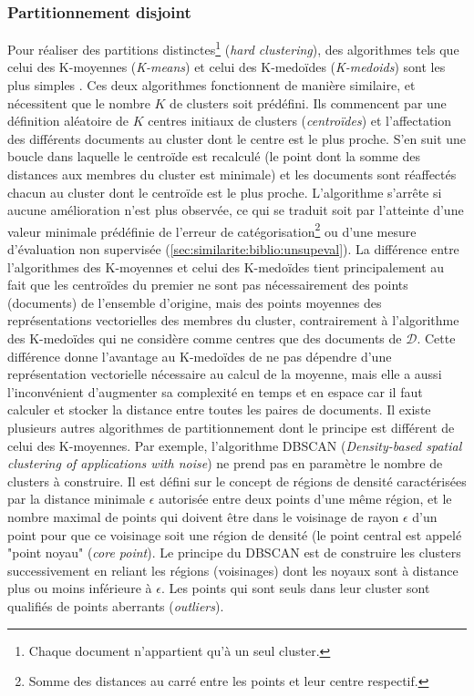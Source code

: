 \subsubsection{Partitionnement disjoint}
Pour réaliser des partitions distinctes\footnote{Chaque document n'appartient qu'à un seul cluster.} (\textit{hard clustering}), des algorithmes tels que celui des K-moyennes (\textit{K-means}) \citep{forgey1965kmeans} et celui des K-medoïdes (\textit{K-medoids}) \citep{kaufman1987kmedoids} sont les plus simples \citep{balabantaray2015KmeansKmedoids}. Ces deux algorithmes fonctionnent de manière similaire, et nécessitent que le nombre $K$ de clusters soit prédéfini. Ils commencent par une définition aléatoire de $K$ centres initiaux de clusters (\textit{centroïdes}) et l'affectation des différents documents au cluster dont le centre est le plus proche. S'en suit une boucle dans laquelle le centroïde est recalculé (le point dont la somme des distances aux membres du cluster est minimale) et les documents sont réaffectés chacun au cluster dont le centroïde est le plus proche. L'algorithme s'arrête si aucune amélioration n'est plus observée, ce qui se traduit soit par l'atteinte d'une valeur minimale prédéfinie de l'erreur de catégorisation\footnote{Somme des distances au carré entre les points et leur centre respectif.} ou d'une mesure d'évaluation non supervisée (\ref{sec:similarite:biblio:unsupeval}). La différence entre l'algorithmes des K-moyennes et celui des K-medoïdes tient principalement au fait que les centroïdes du premier ne sont pas nécessairement des points (documents) de l'ensemble d'origine, mais des points moyennes des représentations vectorielles des membres du cluster, contrairement à l'algorithme des K-medoïdes qui ne considère comme centres que des documents de $\mathcal{D}$. Cette différence donne l'avantage au K-medoïdes de ne pas dépendre d'une représentation vectorielle nécessaire au calcul de la moyenne, mais elle a aussi l'inconvénient d'augmenter sa complexité en temps et en espace car il faut calculer et stocker la distance entre toutes les paires de documents. Il existe plusieurs autres algorithmes de partitionnement dont le principe est différent de celui des K-moyennes. Par exemple, l'algorithme DBSCAN (\textit{Density-based spatial clustering of applications with noise}) \citep{ester1996dbscan}  ne prend pas en paramètre le nombre de clusters à construire. Il est défini sur le concept de régions de densité caractérisées par la distance minimale $\epsilon$ autorisée entre deux points d'une même région, et le nombre maximal de points qui doivent être dans le voisinage de rayon $\epsilon$ d'un point pour que ce voisinage soit une région de densité (le point central est appelé "point noyau" (\textit{core point}). Le principe du DBSCAN est de construire les clusters successivement en reliant les régions (voisinages) dont les noyaux sont à distance plus ou moins inférieure à $\epsilon$. Les points qui sont seuls dans leur cluster sont qualifiés de points aberrants (\textit{outliers}). 

